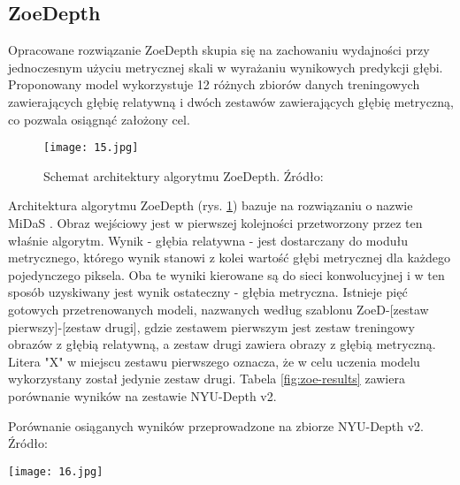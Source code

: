 \subsection{ZoeDepth}
Opracowane rozwiązanie ZoeDepth \cite{bhat2023} skupia się na zachowaniu wydajności przy jednoczesnym użyciu metrycznej skali w wyrażaniu wynikowych predykcji głębi. Proponowany model wykorzystuje 12 różnych zbiorów danych treningowych zawierających głębię relatywną i dwóch zestawów zawierających głębię metryczną, co pozwala osiągnąć założony cel.
\begin{figure}[H]
    \centering
    \texttt{[image: 15.jpg]}
    \caption{Schemat architektury algorytmu ZoeDepth. Źródło: \cite{bhat2023}}
    \label{fig:zoe-schema}
\end{figure}
Architektura algorytmu ZoeDepth (rys. \ref{fig:zoe-schema}) bazuje na rozwiązaniu o nazwie MiDaS \cite{ranftl2020}. Obraz wejściowy jest w pierwszej kolejności przetworzony przez ten właśnie algorytm. Wynik - głębia relatywna - jest dostarczany do modułu metrycznego, którego wynik stanowi z kolei wartość głębi metrycznej dla każdego pojedynczego piksela. Oba te wyniki kierowane są do sieci konwolucyjnej i w ten sposób uzyskiwany jest wynik ostateczny - głębia metryczna. Istnieje pięć gotowych przetrenowanych modeli, nazwanych według szablonu ZoeD-[zestaw pierwszy]-[zestaw drugi], gdzie zestawem pierwszym jest zestaw treningowy obrazów z głębią relatywną, a zestaw drugi zawiera obrazy z głębią metryczną. Litera "X" w miejscu zestawu pierwszego oznacza, że w celu uczenia modelu wykorzystany został jedynie zestaw drugi. Tabela \ref{fig:zoe-results} zawiera porównanie wyników na zestawie NYU-Depth v2.
\begin{table}[H]
    \centering
    \caption{Porównanie osiąganych wyników przeprowadzone na zbiorze NYU-Depth v2. Źródło: \cite{bhat2023}}
    \texttt{[image: 16.jpg]}
    \label{fig:zoe-results}
\end{table}

